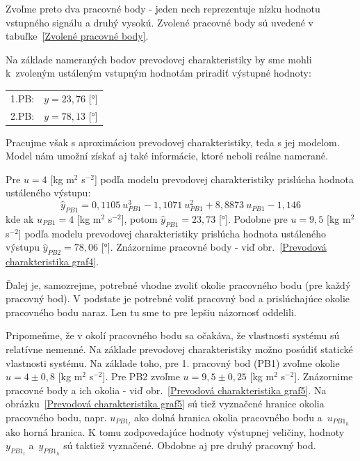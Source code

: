 \documentclass[a4paper, 10pt, ]{article}
\begin{document}
Zvoľme preto dva pracovné body - jeden nech reprezentuje nízku hodnotu vstupného signálu a druhý vysokú. Zvolené pracovné body sú uvedené v tabuľke~\ref{Zvolené pracovné body}.





Na základe nameraných bodov prevodovej charakteristiky by sme mohli k~zvoleným ustáleným vstupným hodnotám priradiť výstupné hodnoty:

\noindent
\begin{tabular}{@{}l l}
    1.PB: & $y=23,76$ [°] \\
    2.PB: & $y=78,13$ [°]
\end{tabular}


Pracujme však s aproximáciou prevodovej charakteristiky, teda s jej modelom. Model nám umožní získať aj také informácie, ktoré neboli reálne namerané.

Pre $u = 4$ [kg m$^2$ s$^{-2}$] podľa modelu prevodovej charakteristiky prislúcha hodnota ustáleného výstupu:
\begin{equation}
    \hat y_{PB1} = 0,1105\ u_{PB1}^3  -1,1071\ u_{PB1}^2 + 8,8873\ u_{PB1}  -1,146
\end{equation}
kde ak $u_{PB1} = 4$ [kg m$^2$ s$^{-2}$], potom $\hat y_{PB1} = 23,73$ [°]. Podobne pre $u = 9,5$ [kg m$^2$ s$^{-2}$] podľa modelu prevodovej charakteristiky prislúcha hodnota ustáleného výstupu $\hat y_{PB2} = 78,06$ [°]. Znázornime pracovné body - viď obr.~\ref{Prevodová charakteristika graf4}.



Ďalej je, samozrejme, potrebné vhodne zvoliť okolie pracovného bodu (pre každý pracovný bod). V podstate je potrebné voliť pracovný bod a prislúchajúce okolie pracovného bodu naraz. Len tu sme to pre lepšiu názornosť oddelili.

Pripomeňme, že v okolí pracovného bodu sa očakáva, že vlastnosti systému sú relatívne nemenné. Na základe prevodovej charakteristiky možno posúdiť statické vlastnosti systému. Na základe toho, pre 1. pracovný bod (PB1) zvoľme okolie $u = 4 \pm 0,8$ [kg m$^2$ s$^{-2}$]. Pre PB2 zvoľme $u = 9,5 \pm 0,25$ [kg m$^2$ s$^{-2}$]. Znázornime pracovné body a ich okolia - viď obr.~\ref{Prevodová charakteristika graf5}. Na obrázku~\ref{Prevodová charakteristika graf5} sú tiež vyznačené hranice okolia pracovného bodu, napr. $u_{PB1_l}$ ako dolná hranica okolia pracovného bodu a~$u_{PB1_h}$ ako horná hranica. K tomu zodpovedajúce hodnoty výstupnej veličiny, hodnoty $y_{PB1_l}$ a~$y_{PB1_h}$ sú taktiež vyznačené. Obdobne aj pre druhý pracovný bod.
\end{document}
